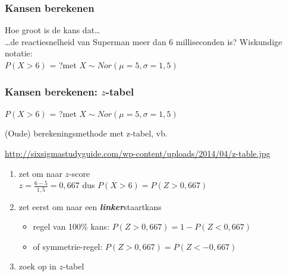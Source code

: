 \documentclass[aspectratio=169]{beamer}
\begin{document}
\begin{frame}
  \frametitle{Kansen berekenen}
  Hoe groot is de kans dat\dots\\
  \dots de reactiesnelheid van Superman meer dan 6 milliseconden is?
  \vfill
  Wiskundige notatie:\\
  \hspace{1cm}$P( X > 6)$ = ?\hspace{1cm}met $X \sim Nor(\mu=5,\sigma=1,5)$
  \vfill
  \begin{center}
  \end{center}
\end{frame}

\begin{frame}
  \frametitle{Kansen berekenen: $z$-tabel}
  
  $P( X > 6)$ = ?\hspace{1cm}met $X \sim Nor(\mu=5,\sigma=1,5)$
  
  \bigskip
  
  (Oude) berekeningsmethode met z-tabel, vb.
  
  \url{http://sixsigmastudyguide.com/wp-content/uploads/2014/04/z-table.jpg}
  
  \begin{enumerate}
    \pause
    \item zet om naar $z$-score\\
    $z=\frac{6-5}{1,5}=0,667$ dus $P(X>6) = P(Z>0,667)$
    \item zet eerst om naar een \textbf{\textit{linker}}staartkans
    \begin{itemize}
      \item regel van 100\% kans: $P(Z>0,667)=1-P(Z<0,667)$
      \item of symmetrie-regel: $P(Z>0,667)=P(Z<-0,667)$
    \end{itemize}
    \item zoek op in $z$-tabel\\
  \end{enumerate}
\end{frame}
\end{document}
